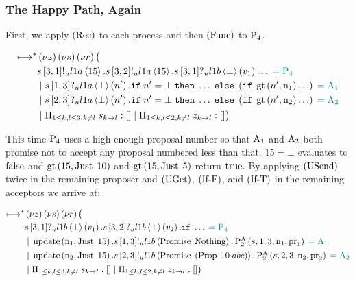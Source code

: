 
\subsubsection{The Happy Path, Again}

First, we apply $\RRec$ to each process and then $\RSideEffect$ to $\Proposer{4}$.

\begin{align*}
\mapstostar& \NuChannels \big (\\
&
    \SendUnreliableP{\ChannelS}{3}{1}{\LOneA}{15}.
    \SendUnreliableP{\ChannelS}{3}{2}{\LOneA}{15}.
    \ReceiveUnreliableP{\ChannelS}{3}{1}{\LOneB}{\bot}{v_1}\ldots
    \comment{= \Proposer{4}}\\
&\Or
    \ReceiveUnreliableP{\ChannelS}{1}{3}{\LOneA}{\bot}{n'}.
    \If n' = \bot
    \;\Then \ldots
    \;\Else \Paren{
            \If \greaterThan{n'}{\NumberRegister_1}
            \ldots
        }
    \comment{= \Acceptor{1}}\\
&\Or
    \ReceiveUnreliableP{\ChannelS}{2}{3}{\LOneA}{\bot}{n'}.
    \If n' = \bot
    \;\Then \ldots
    \;\Else \Paren{
        \If \greaterThan{n'}{\NumberRegister_2}
        \ldots
    }
    \comment{= \Acceptor{2}}\\
&\Or \InnerSessionQueues{\ChannelS}
\Or \OuterSessionQueues
\big )
\end{align*}

This time $\Proposer{4}$ uses a high enough proposal number so that $\Acceptor{1}$ and $\Acceptor{2}$ both promise not to accept any proposal numbered less than that.
$15 = \bot$ evaluates to $\False$ and $\greaterThan{15}{\Just{10}}$ and $\greaterThan{15}{\Just{5}}$ return $\True$.
By applying $\RUsend$ twice in the remaining proposer and $\RUget$, $\RIfF$, and $\RIfT$ in the remaining acceptors we arrive at:

\begin{align*}
\mapstostar& \NuChannels \big (\\
&
    \ReceiveUnreliableP{\ChannelS}{3}{1}{\LOneB}{\bot}{v_1}.
    \ReceiveUnreliableP{\ChannelS}{3}{2}{\LOneB}{\bot}{v_2}.
    \If \ldots
    \comment{= \Proposer{4}}\\
&\Or
    \update{\NumberRegister_1}{\Just{15}}.
    \SendUnreliableP{\ChannelS}{1}{3}{\LOneB}{\Promise{\Nothing}}.
    \PaTwo{\ChannelS, 1, 3, \NumberRegister_1, \ProposalRegister_1}
    \comment{= \Acceptor{1}}\\
&\Or
    \update{\NumberRegister_2}{\Just{15}}.
    \SendUnreliableP{\ChannelS}{2}{3}{\LOneB}{\Promise{\Paren{\ProposalC{10}{abc}}}}.
    \PaTwo{\ChannelS, 2, 3, \NumberRegister_2, \ProposalRegister_2} \comment{= \Acceptor{2}}\\
&\Or \InnerSessionQueues{\ChannelS}
\Or \OuterSessionQueues
\big )
\end{align*}

